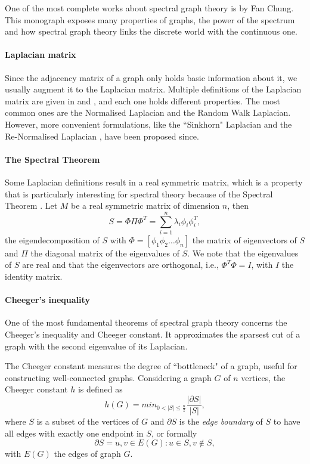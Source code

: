 \documentclass[]{article}
\begin{document}
One of the most complete works about spectral graph theory is \cite{chung_spectral_1997} by Fan Chung.
This monograph exposes many properties of graphs, the power of the spectrum and how spectral graph theory links the discrete world with the continuous one.

\paragraph{Laplacian matrix}
Since the adjacency matrix of a graph only holds basic information about it, we usually augment it to the Laplacian matrix.
Multiple definitions of the Laplacian matrix are given in \cite{chung_spectral_1997} and \cite{siam_slides_2016}, and each one holds different properties.
The most common ones are the Normalised Laplacian and the Random Walk Laplacian.
However, more convenient formulations, like the ``Sinkhorn" Laplacian \cite{milanfar_symmetrizing_2013} and the Re-Normalised Laplacian \cite{siam_slides_2016}, have been proposed since.

\paragraph{The Spectral Theorem}
Some Laplacian definitions result in a real symmetric matrix, which is a property that is particularly interesting for spectral theory because of the Spectral Theorem \cite{zhang_spectral_2010}.
Let \(M\) be a real symmetric matrix of dimension \(n\), then
\[S = \Phi \Pi \Phi^T = \sum_{i=1}^n \lambda_i \phi_i \phi_i^T,\]
the eigendecomposition of \(S\) with \(\Phi = [\phi_1 \phi_2 \dots \phi_n ]\) the matrix of eigenvectors of \(S\) and \(\Pi\) the diagonal matrix of the eigenvalues of \(S\).
We note that the eigenvalues of \(S\) are real and that the eigenvectors are orthogonal, i.e., \(\Phi^T\Phi = I\), with \(I\) the identity matrix.

\paragraph{Cheeger's inequality}
One of the most fundamental theorems of spectral graph theory concerns the Cheeger's inequality and Cheeger constant.
It approximates the sparsest cut of a graph with the second eigenvalue of its Laplacian.

The Cheeger constant \cite{cheeger_lower_1969} measures the degree of ``bottleneck" of a graph, useful for constructing well-connected graphs.
Considering a graph \(G\) of \(n\) vertices, the Cheeger constant \(h\) is defined as
\[h(G) = min_{0 < |S| \le \frac{n}{2}} \frac{|\partial S|}{|S|},\]
where \(S\) is a subset of the vertices of \(G\) and \(\partial S\) is the \textit{edge boundary} of \(S\) to have all edges with exactly one endpoint in \(S\), or formally
\[\partial S = {{u, v} \in E(G) : u \in S, v \notin S},\]
with \(E(G)\) the edges of graph \(G\).
\end{document}
